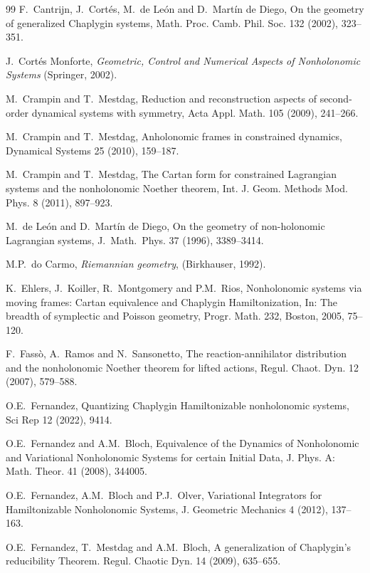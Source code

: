 \documentclass[11pt]{article}
\begin{document}
\begin{thebibliography}{99}
 F.\ Cantrijn, J.\ Cort\'es, M.\ de Le\'on and D.\ Mart\'in de Diego, On the geometry of
generalized Chaplygin systems, Math. Proc. Camb. Phil. Soc. 132 (2002), 323--351.



J.\ Cort\'es Monforte, {\em Geometric, Control and Numerical Aspects of Nonholonomic Systems\/} (Springer, 2002).


 M.\ Crampin and T.\ Mestdag, Reduction and reconstruction aspects of second-order dynamical systems with symmetry,  Acta Appl. Math. 105 (2009), 241--266.

 M.\ Crampin and T.\ Mestdag, Anholonomic frames in constrained
dynamics,  Dynamical Systems  25  (2010), 159--187.

 M.\ Crampin and T.\ Mestdag, The Cartan form for constrained Lagrangian systems and the nonholonomic Noether theorem, Int. J. Geom. Methods Mod. Phys. 8 (2011), 897--923.


M.\ de Le\'{o}n and D.\ Mart\'in de Diego, On the geometry of
non-holonomic Lagrangian systems,   J.\ Math.\ Phys.   37 (1996), 3389--3414.


 M.P.\ do Carmo, {\em  Riemannian geometry}, (Birkhauser, 1992). 


 K.\ Ehlers, J.\ Koiller, R.\ Montgomery and P.M.\ Rios, Nonholonomic systems via moving frames:
Cartan equivalence and Chaplygin Hamiltonization, In: The breadth of symplectic and
Poisson geometry, Progr. Math. 232, Boston, 2005, 75--120.

  F.\ Fass\`o, A.\ Ramos and N.\ Sansonetto, The reaction-annihilator distribution and the nonholonomic Noether theorem for lifted actions, Regul. Chaot. Dyn. 12 (2007), 579--588. 

 O.E.\ Fernandez, Quantizing Chaplygin Hamiltonizable nonholonomic systems, Sci Rep 12 (2022), 9414.


 O.E.\ Fernandez and A.M.\ Bloch, Equivalence of the Dynamics of Nonholonomic and Variational Nonholonomic Systems for certain Initial Data, J. Phys. A: Math. Theor. 41 (2008), 344005.


  O.E.\ Fernandez, A.M.\ Bloch and P.J.\ Olver, Variational Integrators for Hamiltonizable Nonholonomic Systems, J. Geometric Mechanics 4  (2012), 137--163. 

 O.E.\ Fernandez, T.\ Mestdag and A.M.\ Bloch, A generalization of Chaplygin’s reducibility Theorem. Regul. Chaotic Dyn. 14 (2009), 635--655.


\end{thebibliography}
\end{document}
